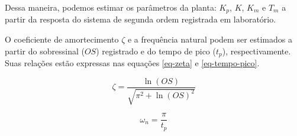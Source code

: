 Dessa maneira, podemos estimar os parâmetros da planta: $K_p$, $K$, $K_m$ e $T_m$ a partir da resposta do sistema de segunda ordem registrada em laboratório.

O coeficiente de amortecimento $\zeta$ e a frequência natural podem ser estimados a partir do sobressinal ($OS$) registrado e do tempo de pico ($t_p$), respectivamente. Suas relações estão expressas nas equações \ref{eq-zeta} e \ref{eq-tempo-pico}.

\begin{equation}
\zeta = \frac{\ln(OS)}{\sqrt{\pi^2 + \ln(OS)^2}}
\label{eq-zeta}
\end{equation}

\begin{equation}
\omega_n = \frac{\pi}{t_p}
\label{eq-tempo-pico}
\end{equation}
